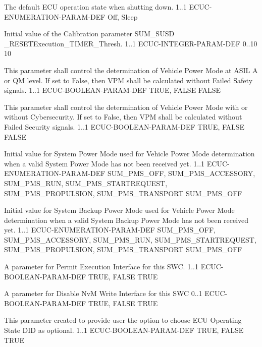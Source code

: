 {
{The default ECU operation state when shutting down.}
{1..1}
{ECUC-ENUMERATION-PARAM-DEF}
{Off, Sleep}
{}}
{ }


{Initial value of the Calibration parameter SUM_SUSD _RESETExecution_TIMER_Thresh.}
{1..1}
{ECUC-INTEGER-PARAM-DEF}
{0..10}
{10}

{This parameter shall control the determination of Vehicle Power Mode at ASIL A or QM level.
If set to False, then VPM shall be calculated without Failed Safety signals.}
{1..1}
{ECUC-BOOLEAN-PARAM-DEF}
{TRUE, FALSE}
{FALSE}

{This parameter shall control the determination of Vehicle Power Mode with or without Cybersecurity.
If set to False, then VPM shall be calculated without Failed Security signals.}
{1..1}
{ECUC-BOOLEAN-PARAM-DEF}
{TRUE, FALSE}
{FALSE}

{Initial value for System Power Mode used for Vehicle Power Mode determination when a valid System Power Mode has not been received yet.}
{1..1}
{ECUC-ENUMERATION-PARAM-DEF}
{SUM_PMS_OFF, SUM_PMS_ACCESSORY, SUM_PMS_RUN, SUM_PMS_STARTREQUEST, SUM_PMS_PROPULSION, SUM_PMS_TRANSPORT}
{SUM_PMS_OFF}

{Initial value for System Backup Power Mode used for Vehicle Power Mode determination when a valid System Backup Power Mode has not been received yet.}
{1..1}
{ECUC-ENUMERATION-PARAM-DEF}
{SUM_PMS_OFF, SUM_PMS_ACCESSORY, SUM_PMS_RUN, SUM_PMS_STARTREQUEST, SUM_PMS_PROPULSION, SUM_PMS_TRANSPORT}
{SUM_PMS_OFF}

{A parameter for Permit Execution Interface for this SWC.}
{1..1}
{ECUC-BOOLEAN-PARAM-DEF}
{TRUE, FALSE}
{TRUE}

{
{A parameter for Disable NvM Write Interface for this SWC}
{0..1}
{ECUC-BOOLEAN-PARAM-DEF}
{TRUE, FALSE}
{TRUE}}
{}

{This parameter created to provide user the option to choose ECU Operating State DID as optional.}
{1..1}
{ECUC-BOOLEAN-PARAM-DEF}
{TRUE, FALSE}
{TRUE}

